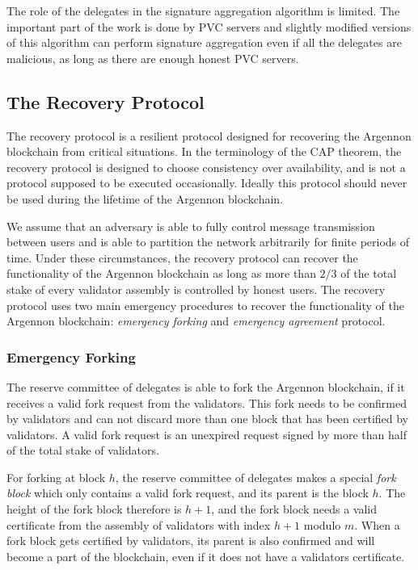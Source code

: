 The role of the delegates in the signature aggregation algorithm is limited. The important part of the work is done by
PVC servers and slightly modified versions of this algorithm can perform signature aggregation
even if all the delegates are malicious, as long as there are enough honest PVC servers.

\subsection{The Recovery Protocol}\label{subsec:recovery}

The recovery protocol is a resilient protocol designed for recovering the Argennon blockchain from critical situations.
In the terminology of the CAP theorem, the recovery protocol is designed to choose consistency over availability,
and is not a protocol supposed to be executed occasionally. Ideally this protocol should never be used
during the lifetime of the Argennon blockchain.

We assume that an adversary is able to fully control message transmission between users and is able to partition the
network arbitrarily for finite periods of time. Under these circumstances, the recovery protocol can recover the
functionality of the Argennon blockchain as long as more than $2/3$ of the total stake of every validator assembly is
controlled by honest users. The recovery protocol uses two main emergency procedures to
recover the functionality of the Argennon blockchain: \emph{emergency forking} and \emph{emergency
agreement} protocol.

\subsubsection{Emergency Forking}

The reserve committee of delegates is able to fork the Argennon blockchain, if it receives a valid fork request
from the validators.
This fork needs to be confirmed by validators and can not discard more than one block that has been certified by
validators.
A valid fork request is an unexpired request signed by more than half of the total stake of validators.

For forking at block $h$, the reserve committee of delegates
makes a special \emph{fork block} which only contains a valid fork request, and its parent is the block $h$.
The height of the fork block therefore is $h + 1$, and the fork block needs a valid certificate from the assembly of
validators with index $h+1$ modulo $m$. When a
fork block gets certified by validators, its parent is also confirmed and will become a part of the blockchain, even if
it does not have a validators certificate.

